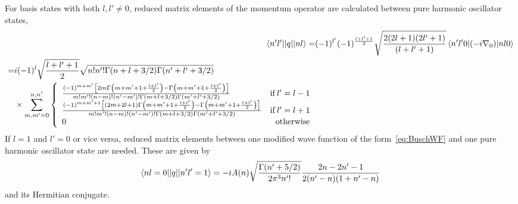 \documentclass[%
 notitlepage,
 preprint,
showpacs,%
 amsmath,amssymb,
 aps,
pra,
]{revtex4-1}
\begin{document}
For basis states with both $l,l'\neq0$, reduced matrix elements of the momentum operator are calculated between pure harmonic oscillator states,
\begin{align}
\braket{n'l' || q || n l}=&(-1)^{l'}(-1)^{\frac{l+l'+1}{2}}\sqrt{\frac{2(2l+1)(2l'+1)}{(l+l'+1)}}\braket{n'l'0| (-i \nabla_0) | n l 0} \\
\begin{split} =& i(-1)^{l}\sqrt{\frac{l+l'+1}{2}}\sqrt{n!n'!\Gamma(n+l+3/2)\Gamma(n'+l'+3/2)} \\ 
&\times\sum_{m,m'=0}^{n,n'} \left\{
     \begin{array}{lr}
       \frac{(-1)^{m+m'}\left[2m\Gamma\left(m+m'+1+\frac{l+l'}{2}\right)-\Gamma\left(m+m'+1+\frac{l+l'}{2}\right)\right]}{m!m'!(n-m)!(n'-m')!\Gamma(m+l+3/2)\Gamma(m'+l'+3/2)} & \text{if}\: l'=l-1 \\
        \frac{(-1)^{m+m'+1}\left[(2m+2l+1)\Gamma\left(m+m'+1+\frac{l+l'}{2}\right)-\Gamma\left(m+m'+1+\frac{l+l'}{2}\right)\right]}{m!m'!(n-m)!(n'-m')!\Gamma(m+l+3/2)\Gamma(m'+l'+3/2)} & \text{if}\: l'=l+1 \\
       0 & \text{otherwise}
     \end{array}
   \right.
   \end{split}
\end{align}
If $l=1$ and $l'=0$ or vice versa, reduced matrix elements between one modified wave function of the form~\eqref{eq:BuschWF} and one pure harmonic oscillator state are needed. These are given by
\begin{align}
\braket{n l=0 || q || n' l'=1}=-i A(n) \sqrt{\frac{\Gamma(n'+5/2)}{2\pi^3 n'!}}\frac{2n-2n'-1}{2(n'-n)(1+n'-n)}
\end{align}
and its Hermitian conjugate.
\end{document}
